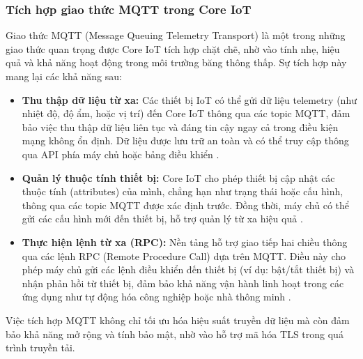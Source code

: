 \subsubsection{Tích hợp giao thức MQTT trong Core IoT}

Giao thức MQTT (Message Queuing Telemetry Transport) là một trong những giao thức quan trọng được Core IoT tích hợp chặt chẽ, nhờ vào tính nhẹ, hiệu quả và khả năng hoạt động trong môi trường băng thông thấp. Sự tích hợp này mang lại các khả năng sau:

\begin{itemize}
    \item \textbf{Thu thập dữ liệu từ xa:} Các thiết bị IoT có thể gửi dữ liệu telemetry (như nhiệt độ, độ ẩm, hoặc vị trí) đến Core IoT thông qua các topic MQTT, đảm bảo việc thu thập dữ liệu liên tục và đáng tin cậy ngay cả trong điều kiện mạng không ổn định. Dữ liệu được lưu trữ an toàn và có thể truy cập thông qua API phía máy chủ hoặc bảng điều khiển \cite{MQTT}.
    \item \textbf{Quản lý thuộc tính thiết bị:} Core IoT cho phép thiết bị cập nhật các thuộc tính (attributes) của mình, chẳng hạn như trạng thái hoặc cấu hình, thông qua các topic MQTT được xác định trước. Đồng thời, máy chủ có thể gửi các cấu hình mới đến thiết bị, hỗ trợ quản lý từ xa hiệu quả \cite{ThingsBoardDocs}.
    \item \textbf{Thực hiện lệnh từ xa (RPC):} Nền tảng hỗ trợ giao tiếp hai chiều thông qua các lệnh RPC (Remote Procedure Call) dựa trên MQTT. Điều này cho phép máy chủ gửi các lệnh điều khiển đến thiết bị (ví dụ: bật/tắt thiết bị) và nhận phản hồi từ thiết bị, đảm bảo khả năng vận hành linh hoạt trong các ứng dụng như tự động hóa công nghiệp hoặc nhà thông minh \cite{MQTT}.
\end{itemize}

Việc tích hợp MQTT không chỉ tối ưu hóa hiệu suất truyền dữ liệu mà còn đảm bảo khả năng mở rộng và tính bảo mật, nhờ vào hỗ trợ mã hóa TLS trong quá trình truyền tải.